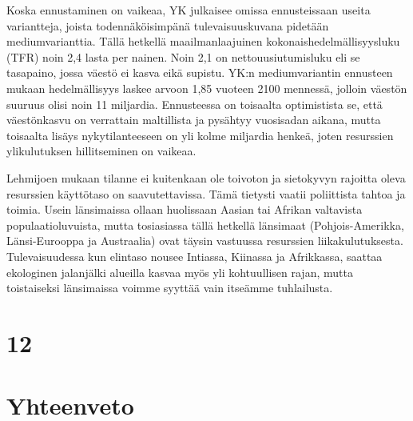 \documentclass[12pt]{article}
\begin{document}
Koska ennustaminen on vaikeaa, YK julkaisee omissa ennusteissaan useita variantteja, joista todennäköisimpänä tulevaisuuskuvana pidetään mediumvarianttia. Tällä hetkellä maailmanlaajuinen kokonaishedelmällisyysluku (TFR) noin 2,4 lasta per nainen. Noin 2,1 on nettouusiutumisluku eli se tasapaino, jossa väestö ei kasva eikä supistu. YK:n mediumvariantin ennusteen mukaan hedelmällisyys laskee arvoon 1,85 vuoteen 2100 mennessä, jolloin väestön suuruus olisi noin 11 miljardia. Ennusteessa on toisaalta optimistista se, että väestönkasvu on verrattain maltillista ja pysähtyy vuosisadan aikana, mutta toisaalta lisäys nykytilanteeseen on yli kolme miljardia henkeä, joten resurssien ylikulutuksen hillitseminen on vaikeaa.

Lehmijoen mukaan tilanne ei kuitenkaan ole toivoton ja sietokyvyn rajoitta oleva resurssien käyttötaso on saavutettavissa. Tämä tietysti vaatii poliittista tahtoa ja toimia. Usein länsimaissa ollaan huolissaan Aasian tai Afrikan valtavista populaatioluvuista, mutta tosiasiassa tällä hetkellä länsimaat (Pohjois-Amerikka, Länsi-Eurooppa ja Austraalia) ovat täysin vastuussa resurssien liikakulutuksesta. Tulevaisuudessa kun elintaso nousee Intiassa, Kiinassa ja Afrikkassa, saattaa ekologinen jalanjälki alueilla kasvaa myös yli kohtuullisen rajan, mutta toistaiseksi länsimaissa voimme syyttää vain itseämme tuhlailusta.


\newpage
\section{12} %


\newpage
\section{Yhteenveto}
\end{document}
